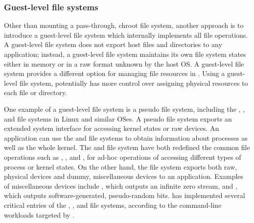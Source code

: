 \subsubsection{Guest-level file systems}


Other than mounting a pass-through, chroot file system,
another approach is to introduce a guest-level file system which internally implements all file operations.
A guest-level file system does not export host files and directories
to any application;
instead, a guest-level file system maintains its own file system states either in memory or in a raw format unknown by the host OS.
A guest-level file system
provides a different option for managing file resources in \thelibos{}. 
Using a guest-level file system,
\thelibos{} potentially has more control over assigning physical resources to each file or directory.


One example of a guest-level file system is a pseudo file system,
including the , , and  file systems in Linux and similar OSes.
A pseudo file system %
exports an extended system interface for accessing kernel states or raw devices.
An application can use the  and  file systems %
to obtain information about processes
as well as the whole kernel. 
The  and  file system have both redefined the common file operations such as , , and , for ad-hoc operations of accessing different types of process or kernel states.
On the other hand, the  file system %
exports both raw, physical devices and dummy, miscellaneous devices to an application.
Examples of miscellaneous devices include , which outputs an infinite zero stream, and , which outputs software-generated, pseudo-random bits.
\thelibos{} has implemented several critical entries of the , , and  file systems,
according to the command-line workloads targeted by \graphene{}. 



